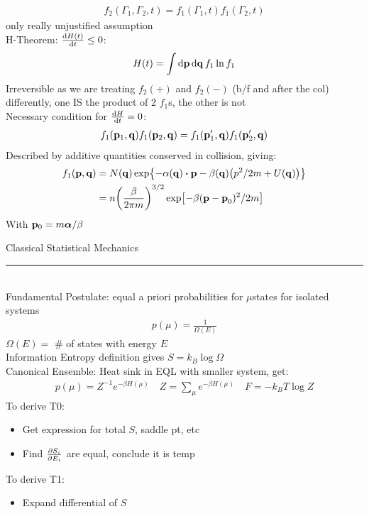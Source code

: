 \documentclass[8pt]{article}
\begin{document}
\begin{multicols*}{2}
\begin{gather*}
    f_2(\Gamma_1,\Gamma_2,t)=f_1(\Gamma_1,t)f_1(\Gamma_2,t)
  \end{gather*}
  only really unjustified assumption\\
  H-Theorem: $\dv{H(t)}{t}\leq0$:
    \begin{gather*}
      H(t)=\int\dd{\vb{p}}\dd{\vb{q}}f_1\ln f_1
    \end{gather*}
    Irreversible as we are treating $f_2(+)$ and $f_2(-)$ (b/f and after the col) differently, one IS the product of 2 $f_1$s, the other is not\\
  Necessary condition for $\dv{H}{t}=0$:
  \begin{gather*}
    f_1(\vb{p}_1,\vb{q})f_1(\vb{p}_2,\vb{q})=
    f_1(\vb{p}_1',\vb{q})f_1(\vb{p}_2',\vb{q})
  \end{gather*}
  Described by additive quantities conserved in collision, giving:
  \begin{align*}
    f_1(\vb{p},\vb{q})&=N(\vb{q})\exp{-\alpha(\vb{q})\vdot\vb{p}
      -\beta(\vb{q})\qty(p^2/2m+U(\vb{q}))}\\
    &=n\qty(\frac{\beta}{2\pi m})^{3/2}\exp[-\beta(\vb{p-p}_0)^2/2m]
  \end{align*}
  With $\vb{p}_0=m\bm{\alpha}/\beta$
  \begin{center}
    \large{Classical Statistical Mechanics}
  \end{center}
    \hrule~\\
  Fundamental Postulate: equal a priori probabilities for $\mu$states for isolated systems
  \begin{gather*}
    p(\mu)=\frac1{\Omega(E)}
  \end{gather*}
  $\Omega(E)=$ \# of states with energy $E$\\
  Information Entropy definition gives $S=k_B\log\Omega$\\
  Canonical Ensemble: Heat sink in EQL with smaller system, get:
  \begin{align*}
    p(\mu)=Z^{-1}e^{-\beta H(\mu)}\quad
    Z=\sum_\mu e^{-\beta H(\mu)}\quad
    F=-k_BT\log Z
  \end{align*}
  To derive T0:
  \begin{itemize}
  \item Get expression for total $S$, saddle pt, etc
  \item Find $\pdv{S_i}{E_i}$ are equal, conclude it is temp
  \end{itemize}
  To derive T1:
  \begin{itemize}
  \item Expand differential of $S$

\end{itemize}
\end{multicols*}
\end{document}

